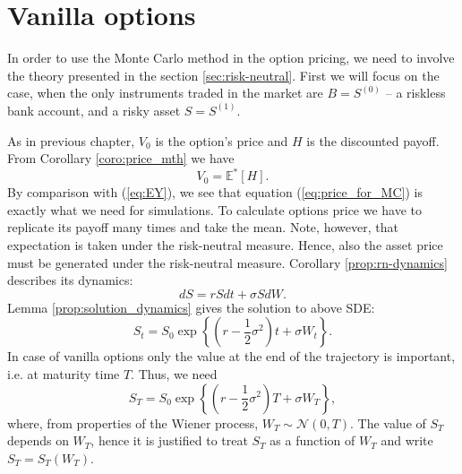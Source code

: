 \documentclass[a4paper,11pt, twoside]{book}
\theoremstyle{definition}
\theoremstyle{remark}
\def\Em{{\mathbb{E}^*}}
\begin{document}
\section{Vanilla options}
\label{sec:pricing_vanilla}

In order to use the Monte Carlo method in the option pricing, we need to involve the theory presented in the section \ref{sec:risk-neutral}. First we will focus on the case, when the only instruments traded in the market are $B = S^{(0)}$ -- a riskless bank account, and a risky asset $S = S^{(1)}$.

As in previous chapter, $V_0$ is the option's price and $H$ is the discounted payoff. From Corollary \ref{coro:price_mth} we have
\begin{equation}
 \label{eq:price_for_MC}
 V_0 = \Em[H].
\end{equation}
By comparison with (\ref{eq:EY}), we see that equation (\ref{eq:price_for_MC}) is exactly what we need for simulations. To calculate options price we have to replicate its payoff many times and take the mean. Note, however, that expectation is taken under the risk-neutral measure. Hence, also the asset price must be generated under the risk-neutral measure. Corollary \ref{prop:rn-dynamics} describes its dynamics:
\[ dS = rSdt + \sigma S dW. \]
Lemma \ref{prop:solution_dynamics} gives the solution to above SDE:
\begin{equation}
 \label{eq:vanilla_St}
 S_t = S_0 \exp\left\{ (r - \frac{1}{2}\sigma^2)t + \sigma W_t \right\}.
\end{equation}
In case of vanilla options only the value at the end of the trajectory is important, i.e. at maturity time $T$. Thus, we need
\begin{equation}
\label{eq:vanilla_ST}
 S_T = S_0 \exp\left\{ (r - \frac{1}{2}\sigma^2)T + \sigma W_T \right\},
\end{equation}
where, from properties of the Wiener process, $W_T \sim \mathcal{N}(0,T)$. The value of $S_T$ depends on $W_T$, hence it is justified to treat $S_T$ as a function of $W_T$ and write $S_T = S_T(W_T)$.
\end{document}
